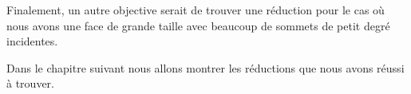 \documentclass[10pt,a4paper]{article}
\begin{document}
Finalement, un autre objective serait de trouver une réduction pour le cas où nous avons une face de grande taille avec beaucoup de sommets de petit degré incidentes. 

Dans le chapitre suivant nous allons montrer les réductions que nous avons réussi à trouver.








\end{document}
